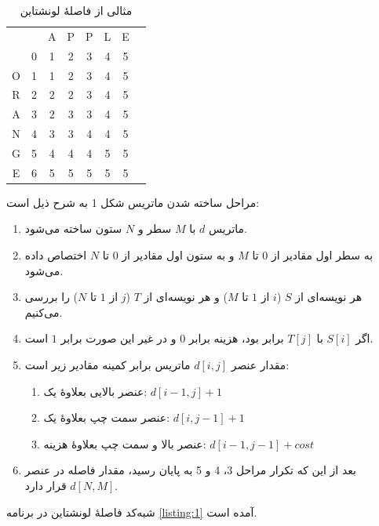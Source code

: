 \documentclass[12pt,onecolumn,a4paper]{article}
\begin{document}
    \begin{table}[H]
        \caption{مثالی از فاصلۀ لونشتاین}
        \label{table:1}
        \centering\setLTR
        \begin{tabular}{c|ccccccc|}
            \multicolumn{1}{c}{} & \multicolumn{1}{c}{} & \cellcolor{blue!25}A & \cellcolor{blue!25}P & \cellcolor{blue!25}P & \cellcolor{blue!25}L & \cellcolor{blue!25}E \tabularnewline \hhline{~|*{6}{-}}
            & 0 & 1 & 2 & 3 & 4 & 5  \tabularnewline
            \cellcolor{blue!25}O & 1 & 1 & 2 & 3 & 4 & 5   \tabularnewline
            \cellcolor{blue!25}R & 2 & 2 & 2 & 3 & 4 & 5   \tabularnewline
            \cellcolor{blue!25}A & 3 & 2 & 3 & 3 & 4 & 5   \tabularnewline
            \cellcolor{blue!25}N & 4 & 3 & 3 & 4 & 4 & 5   \tabularnewline
            \cellcolor{blue!25}G & 5 & 4 & 4 & 4 & 5 & 5   \tabularnewline
            \cellcolor{blue!25}E & 6 & 5 & 5 & 5 & 5 & 5   \tabularnewline
        \end{tabular}
        \setRTL
    \end{table}

    \par
    مراحل ساخته شدن ماتریس شکل 1 به شرح ذیل است:
    \begin{enumerate}
        \item ماتریس $d$ با $M$ سطر و $N$ ستون ساخته می‌شود.
        \item به سطر اول مقادیر از $0$ تا $M$ و به ستون اول مقادیر از $0$ تا $N$ اختصاص داده می‌شود.
        \item هر نویسه‌ای از $S$ ($i$ از $1$ تا $M$)  و هر نویسه‌ای از $T$ ($j$ از $1$ تا $N$) را بررسی می‌کنیم.
        \item اگر $S[i]$ با $T[j]$ برابر بود، هزینه برابر $0$ و در غیر این صورت برابر $1$ است.
        \item مقدار عنصر $d[i, j]$ ماتریس برابر کمینه مقادیر زیر است:
        \begin{enumerate}
            \item عنصر بالایی بعلاوۀ یک: $d[i-1, j]+1$
            \item عنصر سمت چپ بعلاوۀ یک: $d[i, j-1]+1$
            \item عنصر بالا و سمت چپ بعلاوۀ هزینه: $d[i-1, j-1]+cost$
        \end{enumerate}
        \item بعد از این که تکرار مراحل 3، 4 و 5 به پایان رسید، مقدار فاصله در عنصر $d[N,M]$ قرار دارد.
    \end{enumerate}

    \par
    شبه‌کد فاصلۀ لونشتاین در برنامه \ref{listing:1} آمده است.
\end{document}
